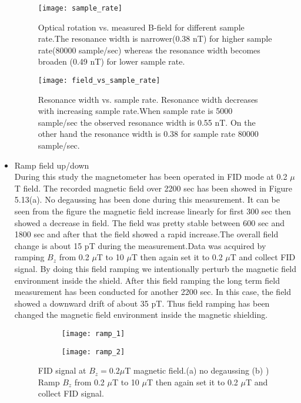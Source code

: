 \documentclass[12pt]{report}
\begin{document}
\begin{itemize}
   \begin{figure}[h]
\centering\texttt{[image: sample\_rate]}
\caption{ Optical rotation vs. measured B-field   for different sample rate.The resonance width is narrower(0.38 nT) for higher sample rate(80000 sample/sec) whereas the resonance width becomes broaden (0.49 nT) for lower sample rate. }
\end{figure}
\begin{figure}[h]
\centering\texttt{[image: field\_vs\_sample\_rate]}
\caption{Resonance width vs. sample rate. Resonance width decreases with increasing sample rate.When sample rate is 5000 sample/sec the observed resonance width is 0.55 nT. On the other hand the resonance width is 0.38 for sample rate 80000 sample/sec.  }
\end{figure}
\newpage
   \item Ramp field up/down \\
  During this study the magnetometer has been operated in FID mode at 0.2 $\mu$T field. The recorded magnetic field over 2200 sec has been showed in Figure 5.13(a). No degaussing has been done during this measurement. It can be seen from the figure the magnetic field increase linearly for first 300 sec then showed a decrease in field. The field was pretty stable between 600 sec and 1800 sec and after that the field showed a rapid increase.The overall field change is about 15 pT during the measurement.Data was acquired by ramping $B_z$  from  0.2 $\mu$T to 10 $\mu$T then again set it to 0.2 $\mu$T and collect FID signal. By doing this field ramping we intentionally perturb the magnetic field environment inside the shield. After this field ramping the long term field measurement has been conducted for another 2200 sec. In this case, the field showed a downward drift of about 35 pT. Thus field ramping has been changed the magnetic field environment inside the magnetic shielding.
   \begin{figure}
    \centering
 
    \begin{subfigure}[b]{0.425\textwidth}
        \centering
        \texttt{[image: ramp\_1]}
        \caption{}
        \label{fig:three sin x}
    \end{subfigure}
    \hfill
    \begin{subfigure}[b]{0.42\textwidth}
        \centering
        \texttt{[image: ramp\_2]}
        \caption{}
        \label{fig:five over x}
    \end{subfigure}
    \caption{ FID signal at $B_z=0.2 \mu$T magnetic field.(a) no degaussing (b) ) Ramp $B_z$  from  0.2 $\mu$T to 10 $\mu$T then again set it to 0.2 $\mu$T and collect FID signal.}
    \label{fig:three graphs}
\end{figure}
   

\end{itemize}
\end{document}
